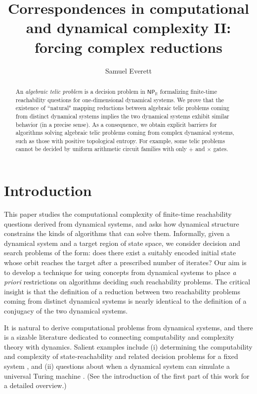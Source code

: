 \documentclass{amsart}
\title[Correspondences in computational and dynamical complexity II]{Correspondences in computational and dynamical complexity II: forcing complex reductions}
\author[S. Everett]{Samuel Everett}
\date{}
\theoremstyle{theorem}
\theoremstyle{remark}
\newcommand{\RR}{\mathbb{R}}
\begin{document}
\begin{abstract}
An \emph{algebraic telic problem} is a decision problem in $\textsf{NP}_\RR$ formalizing finite-time reachability questions for one-dimensional dynamical systems.
We prove that the existence of ``natural" mapping reductions between algebraic telic problems coming from distinct dynamical systems implies the two dynamical systems exhibit similar behavior (in a precise sense).
As a consequence, we obtain explicit barriers for algorithms solving algebraic telic problems coming from complex dynamical systems, such as those with positive topological entropy. For example, some telic problems cannot be decided by uniform arithmetic circuit families with only $+$ and $\times$ gates.
\end{abstract}

\maketitle
\tableofcontents
\pagebreak


\section{Introduction}

This paper studies the computational complexity of finite-time reachability questions derived from dynamical systems, and asks how dynamical structure constrains the kinds of algorithms that can solve them. Informally, given a dynamical system and a target region of state space, we consider decision and search problems of the form: does there exist a suitably encoded initial state whose orbit reaches the target after a prescribed number of iterates? Our aim is to develop a technique for using concepts from dynamical systems to place \emph{a priori} restrictions on algorithms deciding such reachability problems.
The critical insight is that the definition of a reduction between two reachability problems coming from distinct dynamical systems is nearly identical to the definition of a conjugacy of the two dynamical systems. 

It is natural to derive computational problems from dynamical systems, and there is a sizable literature dedicated to connecting computability and complexity theory with dynamics. Salient examples include (i) determining the computability and complexity of state-reachability and related decision problems for a fixed system \cite{gracca2018computing,braverman2009constructing,braverman2006non,rojas2019computational,gracca2024robust}, and (ii) questions about when a dynamical system can simulate a universal Turing machine \cite{moore1991generalized,cotler2024computational,koiran1999closed,bournez2013computation,cardona2021constructing,cardona2022turing,cardona2024hydrodynamic}. (See the introduction of the first part of this work \cite{everett1} for a detailed overview.)
\end{document}
